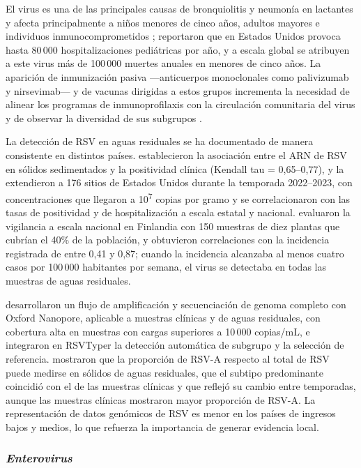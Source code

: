 El virus es una de las principales causas de bronquiolitis y neumonía en lactantes y afecta principalmente a niños menores de cinco años, adultos mayores e individuos inmunocomprometidos \cite{Lansivaara_2024};  reportaron que en Estados Unidos provoca hasta 80\,000 hospitalizaciones pediátricas por año, y a escala global se atribuyen a este virus más de 100\,000 muertes anuales en menores de cinco años. La aparición de inmunización pasiva —anticuerpos monoclonales como palivizumab y nirsevimab— y de vacunas dirigidas a estos grupos incrementa la necesidad de alinear los programas de inmunoprofilaxis con la circulación comunitaria del virus \cite{Mercier_2025} y de observar la diversidad de sus subgrupos \cite{Zambrana_2024}.

La detección de RSV en aguas residuales se ha documentado de manera consistente en distintos países.  establecieron la asociación entre el ARN de RSV en sólidos sedimentados y la positividad clínica (Kendall tau = 0,65--0,77), y  la extendieron a 176 sitios de Estados Unidos durante la temporada 2022--2023, con concentraciones que llegaron a 10\textsuperscript{7} copias por gramo y se correlacionaron con las tasas de positividad y de hospitalización a escala estatal y nacional.  evaluaron la vigilancia a escala nacional en Finlandia con 150 muestras de diez plantas que cubrían el 40\% de la población, y obtuvieron correlaciones con la incidencia registrada de entre 0,41 y 0,87; cuando la incidencia alcanzaba al menos cuatro casos por 100\,000 habitantes por semana, el virus se detectaba en todas las muestras de aguas residuales.

 desarrollaron un flujo de amplificación y secuenciación de genoma completo con Oxford Nanopore, aplicable a muestras clínicas y de aguas residuales, con cobertura alta en muestras con cargas superiores a 10\,000 copias/mL, e integraron en RSVTyper la detección automática de subgrupo y la selección de referencia.  mostraron que la proporción de RSV-A respecto al total de RSV puede medirse en sólidos de aguas residuales, que el subtipo predominante coincidió con el de las muestras clínicas y que reflejó su cambio entre temporadas, aunque las muestras clínicas mostraron mayor proporción de RSV-A. La representación de datos genómicos de RSV es menor en los países de ingresos bajos y medios, lo que refuerza la importancia de generar evidencia local.

\subsubsection{\textit{Enterovirus}}

